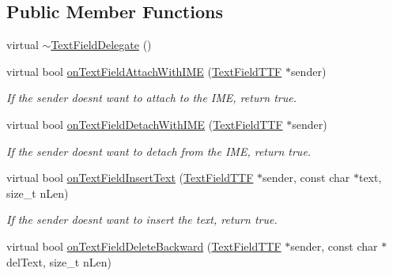 \subsection*{Public Member Functions}
\begin{DoxyCompactItemize}
\item 
virtual \hyperlink{classTextFieldDelegate_a006be6969fc9f895b3a7b0bbc2054a99}{$\sim$\+Text\+Field\+Delegate} ()
\item 
\mbox{\label{classTextFieldDelegate_a8b8ba449d67b6632fe0798dc3211a686}} 
virtual bool \hyperlink{classTextFieldDelegate_a8b8ba449d67b6632fe0798dc3211a686}{on\+Text\+Field\+Attach\+With\+I\+ME} (\hyperlink{classTextFieldTTF}{Text\+Field\+T\+TF} $\ast$sender)
\begin{DoxyCompactList}\small\item\em If the sender doesn\textquotesingle{}t want to attach to the I\+ME, return true. \end{DoxyCompactList}\item 
\mbox{\label{classTextFieldDelegate_aa25a9151d5c9ddcfad5b9d959c0d3d82}} 
virtual bool \hyperlink{classTextFieldDelegate_aa25a9151d5c9ddcfad5b9d959c0d3d82}{on\+Text\+Field\+Detach\+With\+I\+ME} (\hyperlink{classTextFieldTTF}{Text\+Field\+T\+TF} $\ast$sender)
\begin{DoxyCompactList}\small\item\em If the sender doesn\textquotesingle{}t want to detach from the I\+ME, return true. \end{DoxyCompactList}\item 
\mbox{\label{classTextFieldDelegate_a0fdcb3bb95584f593d6e040b0eb1c101}} 
virtual bool \hyperlink{classTextFieldDelegate_a0fdcb3bb95584f593d6e040b0eb1c101}{on\+Text\+Field\+Insert\+Text} (\hyperlink{classTextFieldTTF}{Text\+Field\+T\+TF} $\ast$sender, const char $\ast$text, size\+\_\+t n\+Len)
\begin{DoxyCompactList}\small\item\em If the sender doesn\textquotesingle{}t want to insert the text, return true. \end{DoxyCompactList}\item 
\mbox{\label{classTextFieldDelegate_a8c4484948347229cdf249ec65034c93f}} 
virtual bool \hyperlink{classTextFieldDelegate_a8c4484948347229cdf249ec65034c93f}{on\+Text\+Field\+Delete\+Backward} (\hyperlink{classTextFieldTTF}{Text\+Field\+T\+TF} $\ast$sender, const char $\ast$del\+Text, size\+\_\+t n\+Len)

\end{DoxyCompactItemize}
